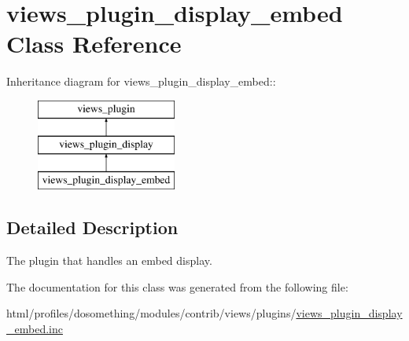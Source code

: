 \hypertarget{classviews__plugin__display__embed}{
\section{views\_\-plugin\_\-display\_\-embed Class Reference}
\label{classviews__plugin__display__embed}
}
Inheritance diagram for views\_\-plugin\_\-display\_\-embed::\begin{figure}[H]
\begin{center}
\leavevmode
\includegraphics[height=3cm]{classviews__plugin__display__embed}
\end{center}
\end{figure}


\subsection{Detailed Description}
The plugin that handles an embed display. 

The documentation for this class was generated from the following file:\begin{DoxyCompactItemize}
\item 
html/profiles/dosomething/modules/contrib/views/plugins/\hyperlink{views__plugin__display__embed_8inc}{views\_\-plugin\_\-display\_\-embed.inc}\end{DoxyCompactItemize}
